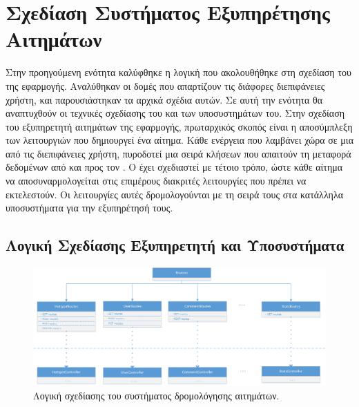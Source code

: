 \section{Σχεδίαση Συστήματος Εξυπηρέτησης Αιτημάτων}
Στην προηγούμενη ενότητα καλύφθηκε η λογική που ακολουθήθηκε στη σχεδίαση του  της εφαρμογής. Αναλύθηκαν οι δομές που απαρτίζουν τις διάφορες διεπιφάνειες χρήστη, και παρουσιάστηκαν τα αρχικά σχέδια αυτών. Σε αυτή την ενότητα θα αναπτυχθούν οι τεχνικές σχεδίασης του  και των υποσυστημάτων του. \newline \indent 
Στην σχεδίαση του εξυπηρετητή αιτημάτων της εφαρμογής, πρωταρχικός σκοπός είναι η αποσύμπλεξη των λειτουργιών που δημιουργεί ένα αίτημα. Κάθε ενέργεια που λαμβάνει χώρα σε μια από τις διεπιφάνειες χρήστη, πυροδοτεί μια σειρά κλήσεων που απαιτούν τη μεταφορά δεδομένων από και προς τον . Ο  έχει σχεδιαστεί με τέτοιο τρόπο, ώστε κάθε αίτημα να αποσυναρμολογείται στις επιμέρους διακριτές λειτουργίες που πρέπει να εκτελεστούν. Οι λειτουργίες αυτές δρομολογούνται με τη σειρά τους στα κατάλληλα υποσυστήματα για την εξυπηρέτησή τους.  

\subsection{Λογική Σχεδίασης Εξυπηρετητή και Υποσυστήματα}

\begin{figure}[H]
    \centering
    \includegraphics[scale=0.4]{figures/router-system.png}
    \caption{Λογική σχεδίασης του συστήματος δρομολόγησης αιτημάτων.}
    \label{routersystem}
\end{figure}

